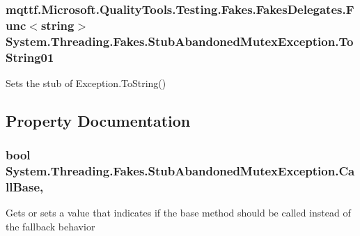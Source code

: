 \hypertarget{class_system_1_1_threading_1_1_fakes_1_1_stub_abandoned_mutex_exception_ac8c0e622ddef2129ff43202e9bb49090}{
\subsubsection[{To\-String01}]{\setlength{\rightskip}{0pt plus 5cm}mqttf.\-Microsoft.\-Quality\-Tools.\-Testing.\-Fakes.\-Fakes\-Delegates.\-Func$<$string$>$ System.\-Threading.\-Fakes.\-Stub\-Abandoned\-Mutex\-Exception.\-To\-String01}}\label{class_system_1_1_threading_1_1_fakes_1_1_stub_abandoned_mutex_exception_ac8c0e622ddef2129ff43202e9bb49090}


Sets the stub of Exception.\-To\-String()



\subsection{Property Documentation}
\hypertarget{class_system_1_1_threading_1_1_fakes_1_1_stub_abandoned_mutex_exception_ad93f2fc1765d46b0e1be0a96709435b5}{
\subsubsection[{Call\-Base}]{\setlength{\rightskip}{0pt plus 5cm}bool System.\-Threading.\-Fakes.\-Stub\-Abandoned\-Mutex\-Exception.\-Call\-Base\hspace{0.3cm}{\ttfamily [get]}, {\ttfamily [set]}}}\label{class_system_1_1_threading_1_1_fakes_1_1_stub_abandoned_mutex_exception_ad93f2fc1765d46b0e1be0a96709435b5}


Gets or sets a value that indicates if the base method should be called instead of the fallback behavior

